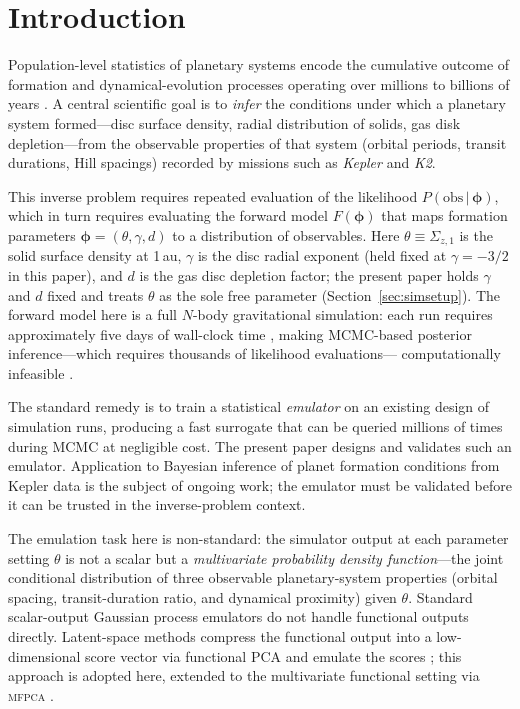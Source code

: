 \documentclass[12pt,a4paper]{article}
\newcommand{\MFPCA}{\textsc{mfpca}}
\newcommand{\spar}{\theta}
\begin{document}
\section{Introduction}
\label{sec:intro}

Population-level statistics of planetary systems encode the cumulative
outcome of formation and dynamical-evolution processes operating over
millions to billions of years \citep{winn2015, mordasini2018,
mulders2021}.  A central scientific goal is to \emph{infer} the
conditions under which a planetary system formed---disc surface density,
radial distribution of solids, gas disk depletion---from the observable
properties of that system (orbital periods, transit durations, Hill
spacings) recorded by missions such as \textit{Kepler} and \textit{K2}.

This inverse problem requires repeated evaluation of the likelihood
$P(\text{obs}\,|\,\boldsymbol{\phi})$, which in turn requires evaluating the
forward model $F(\boldsymbol{\phi})$ that maps formation parameters
$\boldsymbol{\phi}=(\theta,\gamma,d)$ to a distribution of observables.
Here $\theta\equiv\Sigma_{z,1}$ is the solid surface density at 1\,au,
$\gamma$ is the disc radial exponent (held fixed at $\gamma=-3/2$ in this paper), and $d$ is the gas disc depletion factor;
the present paper holds $\gamma$ and $d$ fixed and treats $\theta$ as the
sole free parameter (Section~\ref{sec:simsetup}).  The forward model here is a full $N$-body
gravitational simulation: each run requires approximately five days of
wall-clock time \citep{macdonald2020}, making MCMC-based posterior
inference---which requires thousands of likelihood evaluations---
computationally infeasible \citep{ida2004, benz2014, emsenhuber2021}.

The standard remedy is to train a statistical \emph{emulator}
\citep{kennedy2001, bower2010} on an existing design of simulation runs,
producing a fast surrogate that can be queried millions of times during
MCMC at negligible cost.  The present paper designs and validates such an
emulator.  Application to Bayesian inference of planet formation
conditions from Kepler data is the subject of ongoing work; the emulator
must be validated before it can be trusted in the inverse-problem
context.

The emulation task here is non-standard: the simulator output at each
parameter setting $\spar$ is not a scalar but a
\emph{multivariate probability density function}---the joint
conditional distribution of three observable planetary-system
properties (orbital spacing, transit-duration ratio, and dynamical
proximity) given $\spar$.  Standard scalar-output Gaussian process
emulators \citep{rasmussen2006} do not handle functional outputs
directly.  Latent-space methods compress the functional output into a
low-dimensional score vector via functional PCA and emulate the scores
\citep{higdon2008, fricker2013}; this approach is adopted here,
extended to the multivariate functional setting via \MFPCA
\citep{happ2018}.
\end{document}
